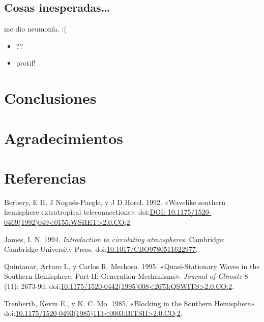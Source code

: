 \documentclass[spanish,a4paper]{book}
\providecommand{\tightlist}{%
  \setlength{\itemsep}{0pt}\setlength{\parskip}{0pt}}
\begin{document}
\section{Cosas inesperadas\ldots{}}\label{cosas-inesperadas}

me dio neumonía. :(

\begin{itemize}
\tightlist
\item
  ??
\item
  protif!
\end{itemize}

\chapter{Conclusiones}\label{conclusiones}

\chapter{Agradecimientos}\label{agradecimientos}

\chapter*{Referencias}\label{referencias}

\hypertarget{refs}{}
\hypertarget{ref-Berbery1992}{}
Berbery, E H, J Nogués-Paegle, y J D Horel. 1992. «Wavelike southern
hemisphere extratropical teleconnections».
doi:\href{https://doi.org/DOI:\%2010.1175/1520-0469(1992)049\%3C0155:WSHET\%3E2.0.CO;2}{DOI: 10.1175/1520-0469(1992)049\textless{}0155:WSHET\textgreater{}2.0.CO;2}.

\hypertarget{ref-James}{}
James, I. N. 1994. \emph{Introduction to circulating atmospheres}.
Cambridge: Cambridge University Press.
doi:\href{https://doi.org/10.1017/CBO9780511622977}{10.1017/CBO9780511622977}.

\hypertarget{ref-Quintanar1995}{}
Quintanar, Arturo I., y Carlos R. Mechoso. 1995. «Quasi-Stationary Waves
in the Southern Hemisphere. Part II: Generation Mechanisms».
\emph{Journal of Climate} 8 (11): 2673-90.
doi:\href{https://doi.org/10.1175/1520-0442(1995)008\%3C2673:QSWITS\%3E2.0.CO;2}{10.1175/1520-0442(1995)008\textless{}2673:QSWITS\textgreater{}2.0.CO;2}.

\hypertarget{ref-Trenberth1985}{}
Trenberth, Kevin E., y K. C. Mo. 1985. «Blocking in the Southern
Hemisphere».
doi:\href{https://doi.org/10.1175/1520-0493(1985)113\%3C0003:BITSH\%3E2.0.CO;2}{10.1175/1520-0493(1985)113\textless{}0003:BITSH\textgreater{}2.0.CO;2}.
\end{document}
